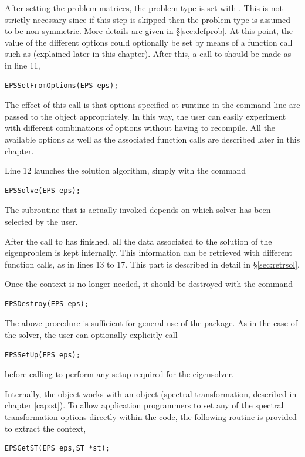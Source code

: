 	After setting the problem matrices, the problem type is set with . This is not strictly necessary since if this step is skipped then the problem type is assumed to be non-symmetric. More details are given in \S\ref{sec:defprob}.
	At this point, the value of the different options could optionally be set by means of a function call such as  (explained later in this chapter). After this, a call to  should be made as in line 11, 
	\begin{Verbatim}[fontsize=\small]
	EPSSetFromOptions(EPS eps);
	\end{Verbatim}
	The effect of this call is that options specified at runtime in the command line are passed to the  object appropriately. In this way, the user can easily experiment with different combinations of options without having to recompile. All the available options as well as the associated function calls are described later in this chapter.

	Line 12 launches the solution algorithm, simply with the command
	\begin{Verbatim}[fontsize=\small]
	EPSSolve(EPS eps);
	\end{Verbatim}
	The subroutine that is actually invoked depends on which solver has been selected by the user. 
        
        After the call to  has finished, all the data associated to the solution of the eigenproblem is kept internally. This information can be retrieved with different function calls, as in lines 13 to 17. This part is described in detail in \S\ref{sec:retrsol}.

	Once the  context is no longer needed, it should be destroyed with the command
	\begin{Verbatim}[fontsize=\small]
	EPSDestroy(EPS eps);
	\end{Verbatim}

	The above procedure is sufficient for general use of the  package. As in the case of the  solver, the user can optionally explicitly call 
	\begin{Verbatim}[fontsize=\small]
	EPSSetUp(EPS eps);
	\end{Verbatim}
before calling  to perform any setup required for the eigensolver.

	Internally, the  object works with an  object (spectral transformation, described in chapter \ref{cap:st}). To allow application programmers to set any of the spectral transformation options directly within the code, the following routine is provided to extract the  context,
	\begin{Verbatim}[fontsize=\small]
	EPSGetST(EPS eps,ST *st);
	\end{Verbatim}
	
